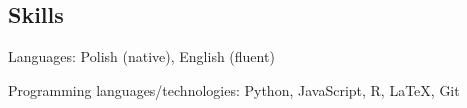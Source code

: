 \documentclass[margin,line]{resume}
\begin{document}
\begin{resume}

    \section{\mysidestyle Skills}
    \begin{list2}
        \item Languages: Polish (native), English (fluent)
        \item Programming languages/technologies: Python, JavaScript, R, LaTeX, Git
    \end{list2}


\end{resume}
\end{document}
